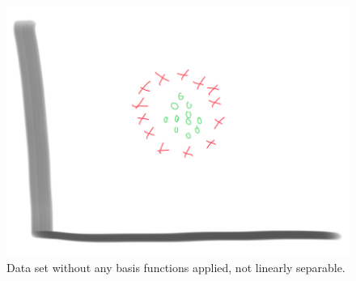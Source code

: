\begin{figure}
    \centering
    \includegraphics[width=0.5\paperwidth]{../Classification/fig/circles_without_basis_change_ipad.jpg}
    \caption{Data set without any basis functions applied, not linearly separable.}
    \label{fig:circles-without-basis-change}
\end{figure}

